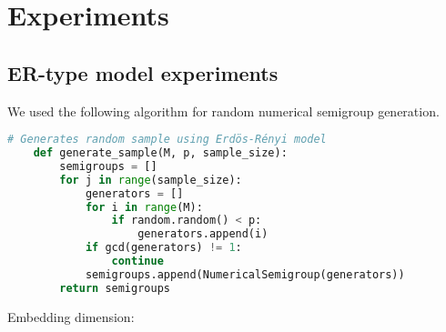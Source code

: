 

\chapter{Experiments}\label{chap:experiments}

\section{ER-type model experiments}

We used the following algorithm for random numerical semigroup generation. 

\begin{lstlisting}[language=Python]
    # Generates random sample using Erdös-Rényi model 
    def generate_sample(M, p, sample_size):
        semigroups = []
        for j in range(sample_size):
            generators = []
            for i in range(M):
                if random.random() < p:
                    generators.append(i)
            if gcd(generators) != 1:
                continue
            semigroups.append(NumericalSemigroup(generators))
        return semigroups
\end{lstlisting}

Embedding dimension:

